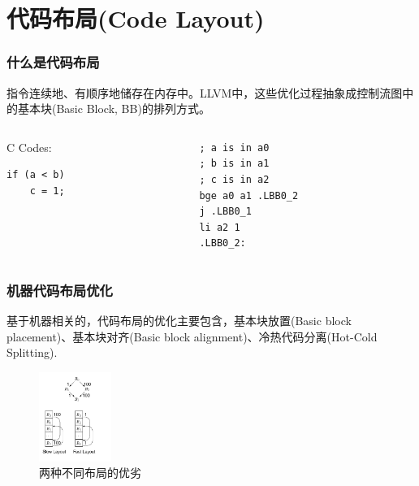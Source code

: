 \section{代码布局(Code Layout)}

\begin{frame}[fragile]
    \frametitle{什么是代码布局}
    指令连续地、有顺序地储存在内存中。LLVM中，这些优化过程抽象成控制流图中的基本块(Basic Block, BB)的排列方式。

    \begin{columns}
        \begin{column}{0.2\textwidth}
            \centering
            C Codes:
            \begin{lstlisting}
if (a < b)
    c = 1;\end{lstlisting}
        \end{column}
        \begin{column}{0.5\textwidth}
\begin{lstlisting}[language={[RISC-V]Assembler}]
; a is in a0
; b is in a1
; c is in a2
bge a0 a1 .LBB0_2
j .LBB0_1
li a2 1
.LBB0_2:\end{lstlisting}
        \end{column}
    \end{columns}
\end{frame}

\begin{frame}
    \frametitle{机器代码布局优化}
    基于机器相关的，代码布局的优化主要包含，基本块放置(Basic block placement)、基本块对齐(Basic block alignment)、冷热代码分离(Hot-Cold Splitting)\cite{bakhvalov-2019}.
    \begin{figure}
        \centering
        \includegraphics[width=0.21\textwidth]{images/layout_compare.png}
        \caption{两种不同布局的优劣\cite{cooper2011engineering}}
    \end{figure}

\end{frame}


